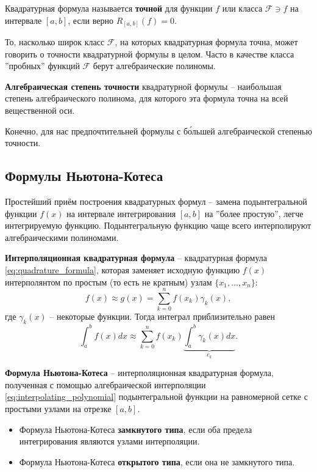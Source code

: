 \documentclass[../main.tex]{subfile}
\begin{document}
\begin{define}
	Квадратурная формула называется \textbf{точной} для функции $f$ или
	класса $\mathcal F\ni f$ на интервале $[a,b]$, если верно $R_{[a,b]}(f)=0$.
\end{define}

То, насколько широк класс $\mathcal F$, на которых квадратурная формула точна,
может говорить о точности квадратурной формулы в целом. Часто в качестве класса
''пробных'' функций $\mathcal F$ берут алгебраические полиномы.

\begin{define}\label{eq:algebraic_degree_of_accuracy}
	\textbf{Алгебраическая степень точности} квадратурной формулы --
	наибольшая степень алгебраического полинома, для которого эта формула
	точна на всей вещественной оси.
\end{define}

Конечно, для нас предпочтительней формулы с б\'{о}льшей алгебраической степенью
точности.

\subsection{Формулы Ньютона-Котеса}
Простейший приём построения квадратурных формул -- замена подынтегральной
функции $f(x)$ на интервале интегрирования $[a,b]$ на ''более простую'',
легче интегрируемую функцию. Подынтегральную функцию чаще всего интерполируют
алгебраическими полиномами.\newpage

\begin{define}
	\textbf{Интерполяционная квадратурная формула} -- квадратурная формула
	\eqref{eq:quadrature_formula}, которая заменяет исходную функцию $f(x)$
	интерполянтом по простым (то есть не кратным) узлам $\{x_1,...,x_n\}$:
	\[f(x)\approx g(x)=\sum_{k=0}^{n}f(x_k)\gamma_k(x),\]
	где $\gamma_k(x)$ -- некоторые функции. Тогда интеграл приблизительно
	равен
	\[\int_{a}^{b}f(x)dx\approx\sum_{k=0}^{n}f(x_k)
	\underset{c_k}{\underbrace{\int_{a}^{b}\gamma_k(x)dx}}.\]
\end{define}

\begin{define}\label{eq:newton_cotes_formula}
	\textbf{Формула Ньютона-Котеса} -- интерполяционная квадратурная
	формула, полученная с помощью алгебраической интерполяции
	\eqref{eq:interpolating_polynomial} подынтегральной функции на
	равномерной сетке с простыми узлами на отрезке $[a,b]$.
\end{define}

\begin{define}
	\begin{itemize}[nosep, before = \leavevmode\vspace{-\baselineskip}]
		\item Формула Ньютона-Котеса \textbf{замкнутого типа},
			если оба предела интегрирования являются узлами
			интерполяции.
		\item Формула Ньютона-Котеса \textbf{открытого типа},
			если она не замкнутого типа.
	\end{itemize}
\end{define}
\end{document}
